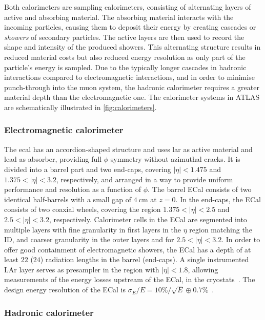 Both calorimeters are sampling calorimeters, consisting of alternating layers of active and absorbing material. The absorbing material interacts with the incoming particles, causing them to deposit their energy by creating cascades or \textit{showers} of secondary particles. The active layers are then used to record the shape and intensity of the produced showers. This alternating structure results in reduced material costs but also reduced energy resolution as only part of the particle's energy is sampled. Due to the typically longer cascades in hadronic interactions compared to electromagnetic interactions, and in order to minimise punch-through into the muon system, the hadronic calorimeter requires a greater material depth than the electromagnetic one. The calorimeter systems in ATLAS are schematically illustrated in \cref{fig:calorimeters}.

\subsubsection{Electromagnetic calorimeter}

The \gls{ecal} has an accordion-shaped structure and uses \gls{lar} as active material and lead as absorber, providing full $\phi$ symmetry without azimuthal cracks. It is divided into a barrel part and two end-caps, covering $\vert\eta\vert <1.475$ and $1.375 < \vert\eta\vert <3.2$, respectively, and arranged in a way to provide uniform performance and resolution as a function of $\phi$. The barrel ECal consists of two identical half-barrels with a small gap of $\SI{4}{\centi\meter}$ at $z=0$. In the end-caps, the ECal consists of two coaxial wheels, covering the region $1.375 < \vert\eta\vert <2.5$ and $2.5 < \vert\eta\vert <3.2$, respectively. Calorimeter cells in the ECal are segmented into multiple layers with fine granularity in first layers in the $\eta$ region matching the ID, and coarser granularity in the outer layers and for $2.5 < \vert\eta\vert <3.2$. In order to offer good containment of electromagnetic showers, the ECal has a depth of at least $22$ ($24$) radiation lengths in the barrel (end-caps). A single instrumented LAr layer serves as presampler in the region with $\vert\eta\vert <1.8$, allowing measurements of the energy losses upstream of the ECal, \eg in the cryostats~\cite{Aad:2008zzm}. The design energy resolution of the ECal is $\sigma_E / E = 10\% / \sqrt{E} \oplus 0.7\%$~\cite{Aad:2008zzm}.

\subsubsection{Hadronic calorimeter}

